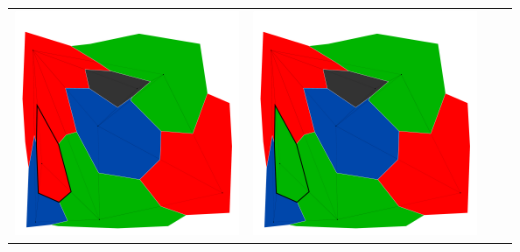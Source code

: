 \documentclass[10pt,a4paper]{article}
\begin{document}
\begin{tabular}{c c c c }
	\includegraphics[scale=.10]{../results/backtracking_simple/map_build/bt_simple_I00013.pdf}&
	\includegraphics[scale=.10]{../results/backtracking_simple/map_build/bt_simple_I00014.pdf}&

\end{tabular}
\end{document}
